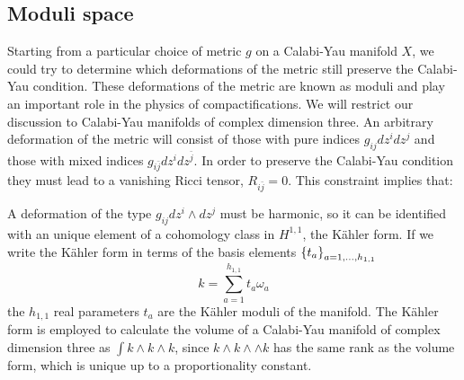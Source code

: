 %
%
%
%
%
%
%
%
%
%
%
%
%
\subsection{Moduli space}

Starting from a particular choice of metric $g$ on a Calabi-Yau manifold $X$, we could try to determine
which deformations of the metric still preserve the Calabi-Yau condition.
These deformations of the metric are known as moduli and play an important role in the physics of compactifications.
We will restrict our discussion to Calabi-Yau manifolds of complex dimension three.
An arbitrary deformation of the metric will consist of those with pure 
indices $g_{ij}dz^i dz^j$ and those with mixed indices $g_{i\bar j}dz^i dz^{\bar j}$.
In order to preserve the Calabi-Yau condition they must lead to a vanishing Ricci tensor, $R_{i\bar j}=0$.
This constraint implies that:

 A deformation of the type $g_{ij}dz^i \wedge dz^j$ must be harmonic, so it can be identified with an unique element of a cohomology class in $H^{1,1}$, the Kähler form.
 If we write the Kähler form in terms of the basis elements $\qty{t_a}_{a=1,\ldots,h_{1,1}}$
\begin{equation}
k=\sum_{a=1}^{h_{1,1}}t_a \omega_a
\end{equation}
the $h_{1,1}$ real parameters $t_a$ are the Kähler moduli of the manifold.
The Kähler form is employed to calculate the volume of a Calabi-Yau manifold of complex dimension three as
$\int k\wedge k\wedge k$, since $k\wedge k\wedge \wedge k$ has the same rank as the
volume form, which is unique up to a proportionality constant.

